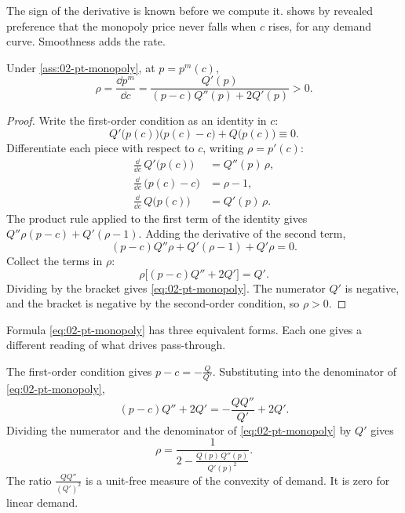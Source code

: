 The sign of the derivative is known before we compute it.
 shows by revealed preference that the monopoly price never falls when $c$ rises, for any
demand curve. Smoothness adds the rate.

\begin{proposition}\label{prop:02-pt-monopoly}
Under \cref{ass:02-pt-monopoly}, at $p = p^m(c)$,
\begin{equation}\label{eq:02-pt-monopoly}
\rho = \frac{\dd p^m}{\dd c} = \frac{Q'(p)}{(p - c)Q''(p) + 2Q'(p)} > 0 .
\end{equation}
\end{proposition}

\begin{proof}
Write the first-order condition as an identity in $c$:
\begin{equation*}
Q'\bigl(p(c)\bigr)\bigl(p(c) - c\bigr) + Q\bigl(p(c)\bigr) \equiv 0 .
\end{equation*}
Differentiate each piece with respect to $c$, writing $\rho = p'(c)$:
\begin{align*}
\frac{\dd}{\dd c}\, Q'\bigl(p(c)\bigr) &= Q''(p)\,\rho , \\
\frac{\dd}{\dd c}\, \bigl(p(c) - c\bigr) &= \rho - 1 , \\
\frac{\dd}{\dd c}\, Q\bigl(p(c)\bigr) &= Q'(p)\,\rho .
\end{align*}
The product rule applied to the first term of the identity gives $Q''\rho(p - c) + Q'(\rho - 1)$. Adding the
derivative of the second term,
\begin{equation*}
(p - c)Q''\rho + Q'(\rho - 1) + Q'\rho = 0 .
\end{equation*}
Collect the terms in $\rho$:
\begin{equation*}
\rho\bigl[(p - c)Q'' + 2Q'\bigr] = Q' .
\end{equation*}
Dividing by the bracket gives \eqref{eq:02-pt-monopoly}. The numerator $Q'$ is negative, and the bracket is
negative by the second-order condition, so $\rho > 0$.
\end{proof}

Formula \eqref{eq:02-pt-monopoly} has three equivalent forms. Each one gives a different reading of what drives
pass-through.

The first-order condition gives $p - c = -\frac{Q}{Q'}$. Substituting into the denominator of
\eqref{eq:02-pt-monopoly},
\begin{equation*}
(p - c)Q'' + 2Q' = -\frac{QQ''}{Q'} + 2Q' .
\end{equation*}
Dividing the numerator and the denominator of \eqref{eq:02-pt-monopoly} by $Q'$ gives
\begin{equation}\label{eq:02-pt-logcurv}
\rho = \frac{1}{2 - \frac{Q(p)\,Q''(p)}{Q'(p)^2}} .
\end{equation}
The ratio $\frac{QQ''}{(Q')^2}$ is a unit-free measure of the convexity of demand. It is zero for linear demand.

